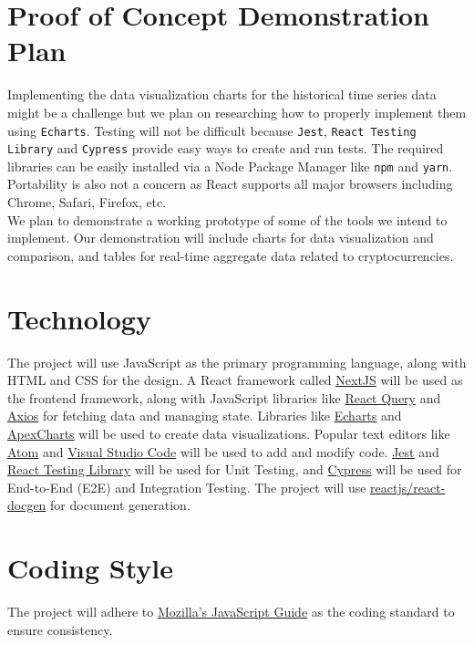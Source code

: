 \documentclass[12pt,fleqn]{article}
\begin{document}
\section{Proof of Concept Demonstration Plan}
\noindent Implementing the data visualization charts for the historical time series data might be a challenge but we plan on researching how to properly implement them using \texttt{Echarts}. Testing will not be difficult because \texttt{Jest}, \texttt{React Testing Library} and \texttt{Cypress} provide easy ways to create and run tests. The required libraries can be easily installed via a Node Package Manager like \texttt{npm} and \texttt{yarn}. Portability is also not a concern as React supports all major browsers including Chrome, Safari, Firefox, etc.\\
\newline
\noindent We plan to demonstrate a working prototype of some of the tools we intend to implement. Our demonstration will include charts for data visualization and comparison, and tables for real-time aggregate data related to cryptocurrencies.


\section{Technology}
\noindent The project will use JavaScript as the primary programming language, along with HTML and CSS for the design. A React framework called \href{https://nextjs.org/}{NextJS} will be used as the frontend framework, along with JavaScript libraries like \href{https://react-query.tanstack.com/}{React Query} and \href{https://axios-http.com/docs/intro}{Axios} for fetching data and managing state. Libraries like \href{https://echarts.apache.org/en/index.html}{Echarts} and \href{https://apexcharts.com/}{ApexCharts} will be used to create data visualizations. Popular text editors like \href{https://atom.io/}{Atom} and \href{https://code.visualstudio.com/}{Visual Studio Code} will be used to add and modify code. \href{https://jestjs.io/}{Jest} and \href{https://github.com/testing-library/react-testing-library}{React Testing Library} will be used for Unit Testing, and \href{https://www.cypress.io/}{Cypress} will be used for End-to-End (E2E) and Integration Testing. The project will use {\href{https://github.com/reactjs/react-docgen}{reactjs/react-docgen}} for document generation.

\section{Coding Style}
\noindent The project will adhere to \href{https://developer.mozilla.org/en-US/docs/Web/JavaScript/Guide}{Mozilla's JavaScript Guide} as the coding standard to ensure consistency.
\end{document}
